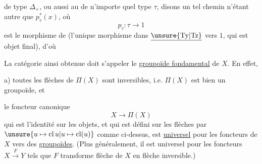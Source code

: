 de type $\Delta_+$, ou aussi au  de n'importe quel type $\tau$, disons
un tel chemin n'étant autre que $p_\tau^*(x)$, où
\[p_\tau:\tau\longrightarrow 1\]
est le morphisme de  (l'unique morphisme dans $\underline{\unsure{\mathrm{Ty}|\mathrm{Tz}}}$ vers $1$, qui est objet final),
d'où

La catégorie  ainsi obtenue doit s'appeler le \uline{groupoïde fondamental} de $X$. En effet, 

a) toutes les flèches de $\Pi(X)$ sont inversibles, i.e. $\Pi(X)$ est bien un groupoïde, et

 le foncteur canonique
\[X\longrightarrow\Pi(X)\]
qui est l'identité sur les objets, et qui est défini sur les flèches par $\unsure{u\mapsto\mathrm{cl}\,u|u\mapsto\mathrm{cl}(u)}$ comme ci-dessus, est \uline{universel}  pour les foncteurs  de $X$ vers des \uline{groupoïdes}.
(Plus généralement, il est universel pour les foncteurs $X\xrightarrow{F}Y$ tels que $F$ transforme  flèche de $X$ en flèche inversible.)
